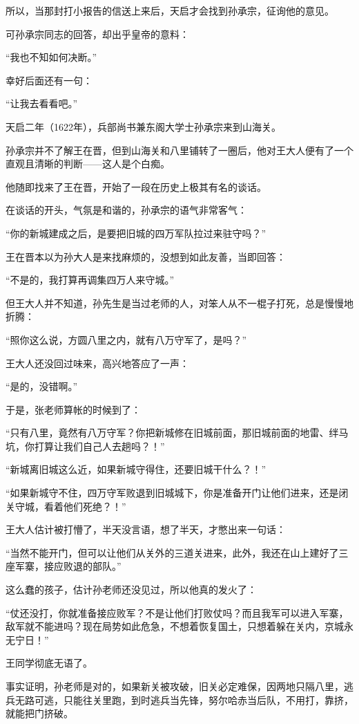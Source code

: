 \begin{multicols}{\theparacolNo}
所以，当那封打小报告的信送上来后，天启才会找到孙承宗，征询他的意见。

可孙承宗同志的回答，却出乎皇帝的意料：

“我也不知如何决断。”

幸好后面还有一句：

“让我去看看吧。”

天启二年（1622年），兵部尚书兼东阁大学士孙承宗来到山海关。

孙承宗并不了解王在晋，但到山海关和八里铺转了一圈后，他对王大人便有了一个直观且清晰的判断——这人是个白痴。

他随即找来了王在晋，开始了一段在历史上极其有名的谈话。

在谈话的开头，气氛是和谐的，孙承宗的语气非常客气：

“你的新城建成之后，是要把旧城的四万军队拉过来驻守吗？”

王在晋本以为孙大人是来找麻烦的，没想到如此友善，当即回答：

“不是的，我打算再调集四万人来守城。”

但王大人并不知道，孙先生是当过老师的人，对笨人从不一棍子打死，总是慢慢地折腾：

“照你这么说，方圆八里之内，就有八万守军了，是吗？”

王大人还没回过味来，高兴地答应了一声：

“是的，没错啊。”

于是，张老师算帐的时候到了：

“只有八里，竟然有八万守军？你把新城修在旧城前面，那旧城前面的地雷、绊马坑，你打算让我们自己人去趟吗？！”

“新城离旧城这么近，如果新城守得住，还要旧城干什么？！”

“如果新城守不住，四万守军败退到旧城城下，你是准备开门让他们进来，还是闭关守城，看着他们死绝？！”

王大人估计被打懵了，半天没言语，想了半天，才憋出来一句话：

“当然不能开门，但可以让他们从关外的三道关进来，此外，我还在山上建好了三座军寨，接应败退的部队。”

这么蠢的孩子，估计孙老师还没见过，所以他真的发火了：

“仗还没打，你就准备接应败军？不是让他们打败仗吗？而且我军可以进入军寨，敌军就不能进吗？现在局势如此危急，不想着恢复国土，只想着躲在关内，京城永无宁日！”

王同学彻底无语了。

事实证明，孙老师是对的，如果新关被攻破，旧关必定难保，因两地只隔八里，逃兵无路可逃，只能往关里跑，到时逃兵当先锋，努尔哈赤当后队，不用打，靠挤，就能把门挤破。


\end{multicols}
